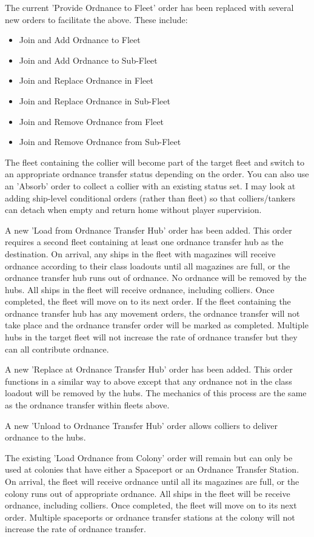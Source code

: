 \documentclass[../Aurora C# unofficial manual.tex]{subfiles}
\begin{document}
	The current 'Provide Ordnance to Fleet' order has been replaced with several new orders to facilitate the above. These include:
	\begin{itemize}
		\item Join and Add Ordnance to Fleet
		\item Join and Add Ordnance to Sub-Fleet
		\item Join and Replace Ordnance in Fleet
		\item Join and Replace Ordnance in Sub-Fleet
		\item Join and Remove Ordnance from Fleet
		\item Join and Remove Ordnance from Sub-Fleet
	\end{itemize}
	
	The fleet containing the collier will become part of the target fleet and switch to an appropriate ordnance transfer status depending on the order. You can also use an 'Absorb' order to collect a collier with an existing status set. I may look at adding ship-level conditional orders (rather than fleet) so that colliers/tankers can detach when empty and return home without player supervision.
	
	A new 'Load from Ordnance Transfer Hub' order has been added. This order requires a second fleet containing at least one ordnance transfer hub as the destination. On arrival, any ships in the fleet with magazines will receive ordnance according to their class loadouts until all magazines are full, or the ordnance transfer hub runs out of ordnance. No ordnance will be removed by the hubs. All ships in the fleet will receive ordnance, including colliers. Once completed, the fleet will move on to its next order. If the fleet containing the ordnance transfer hub has any movement orders, the ordnance transfer will not take place and the ordnance transfer order will be marked as completed. Multiple hubs in the target fleet will not increase the rate of ordnance transfer but they can all contribute ordnance.
	
	A new 'Replace at Ordnance Transfer Hub' order has been added. This order functions in a similar way to above except that any ordnance not in the class loadout will be removed by the hubs. The mechanics of this process are the same as the ordnance transfer within fleets above.
	
	A new 'Unload to Ordnance Transfer Hub' order allows colliers to deliver ordnance to the hubs.
	
	The existing 'Load Ordnance from Colony' order will remain but can only be used at colonies that have either a Spaceport or an Ordnance Transfer Station. On arrival, the fleet will receive ordnance until all its magazines are full, or the colony runs out of appropriate ordnance. All ships in the fleet will be receive ordnance, including colliers. Once completed, the fleet will move on to its next order. Multiple spaceports or ordnance transfer stations at the colony will not increase the rate of ordnance transfer.
	
\end{document}
